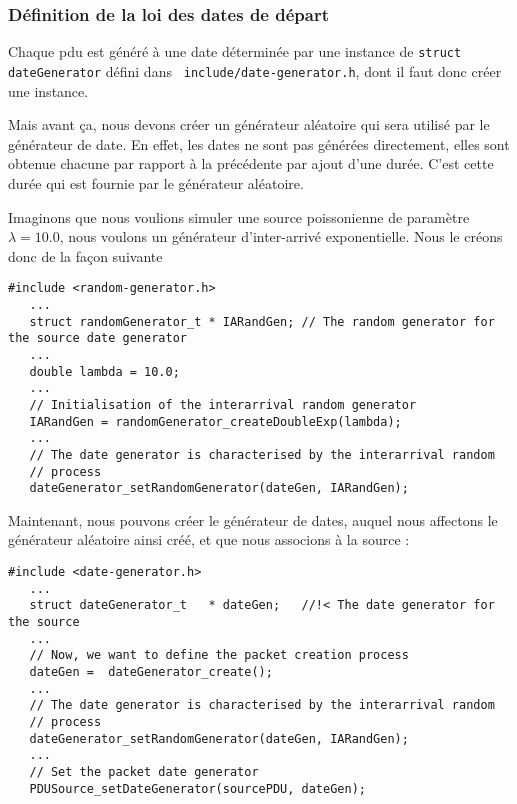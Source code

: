 \subsubsection{Définition de la loi des dates de départ}

   Chaque {\sc pdu} est généré à une date déterminée par une instance
de \lstinline!struct dateGenerator! défini dans {\tt
  include/date-generator.h}, dont il faut donc créer une instance.

   Mais avant ça, nous devons créer un générateur aléatoire  qui sera
utilisé par le générateur de date. En effet, les dates ne sont pas
générées directement, elles sont obtenue chacune par rapport à la
précédente par ajout d'une durée. C'est cette durée qui est fournie
par le générateur aléatoire.

   Imaginons que nous voulions simuler une source poissonienne de
paramètre $\lambda =10.0$, nous voulons un générateur d'inter-arrivé
exponentielle. Nous le créons donc de la façon suivante

\begin{verbatim}
#include <random-generator.h>
   ...
   struct randomGenerator_t * IARandGen; // The random generator for the source date generator
   ...
   double lambda = 10.0;
   ...
   // Initialisation of the interarrival random generator
   IARandGen = randomGenerator_createDoubleExp(lambda);
   ...
   // The date generator is characterised by the interarrival random
   // process
   dateGenerator_setRandomGenerator(dateGen, IARandGen);
\end{verbatim}

   Maintenant, nous pouvons créer le générateur de dates, auquel nous
affectons le générateur aléatoire ainsi créé, et que nous associons à
la source :

\begin{verbatim}
#include <date-generator.h>
   ...
   struct dateGenerator_t   * dateGen;   //!< The date generator for the source
   ...
   // Now, we want to define the packet creation process
   dateGen =  dateGenerator_create();
   ...
   // The date generator is characterised by the interarrival random
   // process
   dateGenerator_setRandomGenerator(dateGen, IARandGen);
   ...
   // Set the packet date generator
   PDUSource_setDateGenerator(sourcePDU, dateGen);
\end{verbatim}

%
